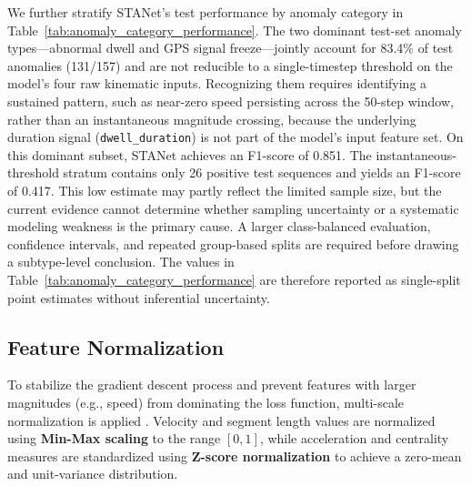 \documentclass[journal]{IEEEtran}
\begin{document}
We further stratify STANet's test performance by anomaly category in Table~\ref{tab:anomaly_category_performance}. The two dominant test-set anomaly types---abnormal dwell and GPS signal freeze---jointly account for 83.4\% of test anomalies (131/157) and are not reducible to a single-timestep threshold on the model's four raw kinematic inputs. Recognizing them requires identifying a sustained pattern, such as near-zero speed persisting across the 50-step window, rather than an instantaneous magnitude crossing, because the underlying duration signal (\texttt{dwell\_duration}) is not part of the model's input feature set. On this dominant subset, STANet achieves an F1-score of 0.851. The instantaneous-threshold stratum contains only 26 positive test sequences and yields an F1-score of 0.417. This low estimate may partly reflect the limited sample size, but the current evidence cannot determine whether sampling uncertainty or a systematic modeling weakness is the primary cause. A larger class-balanced evaluation, confidence intervals, and repeated group-based splits are required before drawing a subtype-level conclusion. The values in Table~\ref{tab:anomaly_category_performance} are therefore reported as single-split point estimates without inferential uncertainty.

\begin{table}[!htbp]
  \centering
  \caption{STANet test performance stratified by anomaly category}
  \label{tab:anomaly_category_performance}
  \renewcommand{\arraystretch}{1.15}
\end{table}

\subsection{Feature Normalization}
To stabilize the gradient descent process and prevent features with larger magnitudes (e.g., speed) from dominating the loss function, multi-scale normalization is applied \cite{huang_multivariate_2024}. Velocity and segment length values are normalized using \textbf{Min-Max scaling} to the range $[0, 1]$, while acceleration and centrality measures are standardized using \textbf{Z-score normalization} to achieve a zero-mean and unit-variance distribution.
\end{document}

